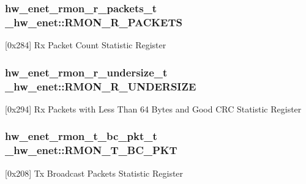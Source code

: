 \subsubsection[{\texorpdfstring{R\+M\+O\+N\+\_\+\+R\+\_\+\+P\+A\+C\+K\+E\+TS}{RMON_R_PACKETS}}]{ {\bf hw\+\_\+enet\+\_\+rmon\+\_\+r\+\_\+packets\+\_\+t} \+\_\+hw\+\_\+enet\+::\+R\+M\+O\+N\+\_\+\+R\+\_\+\+P\+A\+C\+K\+E\+TS}\hypertarget{struct__hw__enet_ae2ad9c6d0c01820623bf3d6ef2843b07}{}\label{struct__hw__enet_ae2ad9c6d0c01820623bf3d6ef2843b07}
\mbox{[}0x284\mbox{]} Rx Packet Count Statistic Register 
\subsubsection[{\texorpdfstring{R\+M\+O\+N\+\_\+\+R\+\_\+\+U\+N\+D\+E\+R\+S\+I\+ZE}{RMON_R_UNDERSIZE}}]{ {\bf hw\+\_\+enet\+\_\+rmon\+\_\+r\+\_\+undersize\+\_\+t} \+\_\+hw\+\_\+enet\+::\+R\+M\+O\+N\+\_\+\+R\+\_\+\+U\+N\+D\+E\+R\+S\+I\+ZE}\hypertarget{struct__hw__enet_ac567be088e1a146524e825b3dad2d1df}{}\label{struct__hw__enet_ac567be088e1a146524e825b3dad2d1df}
\mbox{[}0x294\mbox{]} Rx Packets with Less Than 64 Bytes and Good C\+RC Statistic Register 
\subsubsection[{\texorpdfstring{R\+M\+O\+N\+\_\+\+T\+\_\+\+B\+C\+\_\+\+P\+KT}{RMON_T_BC_PKT}}]{ {\bf hw\+\_\+enet\+\_\+rmon\+\_\+t\+\_\+bc\+\_\+pkt\+\_\+t} \+\_\+hw\+\_\+enet\+::\+R\+M\+O\+N\+\_\+\+T\+\_\+\+B\+C\+\_\+\+P\+KT}\hypertarget{struct__hw__enet_af69899372ec818326e046d7f33c42be6}{}\label{struct__hw__enet_af69899372ec818326e046d7f33c42be6}
\mbox{[}0x208\mbox{]} Tx Broadcast Packets Statistic Register 
